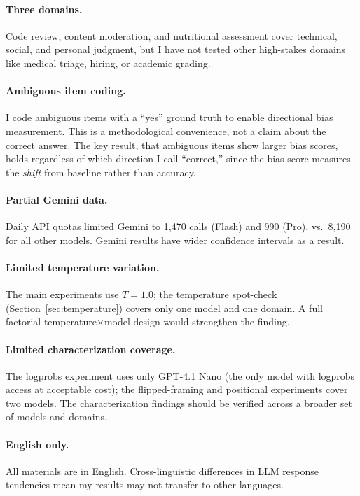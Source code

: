 \documentclass[10pt,twocolumn]{article}
\begin{document}
\paragraph{Three domains.}
Code review, content moderation, and nutritional assessment cover technical, social, and personal judgment, but I have not tested other high-stakes domains like medical triage, hiring, or academic grading.

\paragraph{Ambiguous item coding.}
I code ambiguous items with a ``yes'' ground truth to enable directional bias measurement.
This is a methodological convenience, not a claim about the correct answer.
The key result, that ambiguous items show larger bias scores, holds regardless of which direction I call ``correct,'' since the bias score measures the \textit{shift} from baseline rather than accuracy.

\paragraph{Partial Gemini data.}
Daily API quotas limited Gemini to 1,470 calls (Flash) and 990 (Pro), vs.\ 8,190 for all other models.
Gemini results have wider confidence intervals as a result.

\paragraph{Limited temperature variation.}
The main experiments use $T = 1.0$; the temperature spot-check (Section~\ref{sec:temperature}) covers only one model and one domain.
A full factorial temperature$\times$model design would strengthen the finding.

\paragraph{Limited characterization coverage.}
The logprobs experiment uses only GPT-4.1 Nano (the only model with logprobs access at acceptable cost); the flipped-framing and positional experiments cover two models.
The characterization findings should be verified across a broader set of models and domains.

\paragraph{English only.}
All materials are in English.
Cross-linguistic differences in LLM response tendencies \cite{braun2025acquiescence} mean my results may not transfer to other languages.
\end{document}
